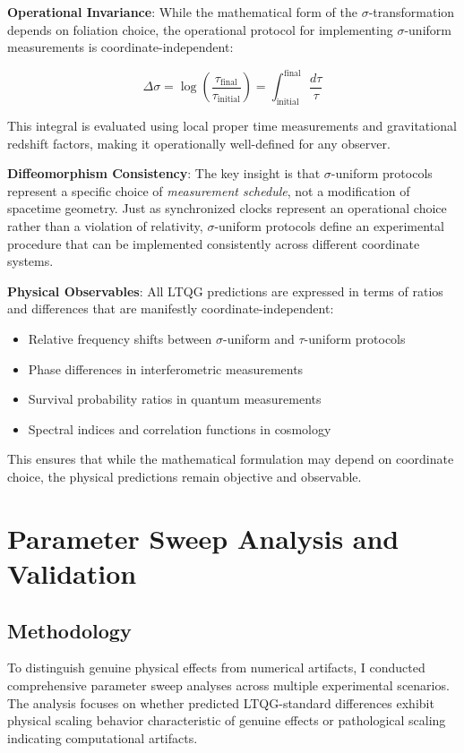 \documentclass[12pt,a4paper]{article}
\begin{document}
\textbf{Operational Invariance}: While the mathematical form of the $\sigma$-transformation depends on foliation choice, the operational protocol for implementing $\sigma$-uniform measurements is coordinate-independent:

\begin{equation}
\Delta \sigma = \log\left(\frac{\tau_{\text{final}}}{\tau_{\text{initial}}}\right) = \int_{\text{initial}}^{\text{final}} \frac{d\tau}{\tau}
\end{equation}

This integral is evaluated using local proper time measurements and gravitational redshift factors, making it operationally well-defined for any observer.

\textbf{Diffeomorphism Consistency}: The key insight is that $\sigma$-uniform protocols represent a specific choice of \emph{measurement schedule}, not a modification of spacetime geometry. Just as synchronized clocks represent an operational choice rather than a violation of relativity, $\sigma$-uniform protocols define an experimental procedure that can be implemented consistently across different coordinate systems.

\textbf{Physical Observables}: All LTQG predictions are expressed in terms of ratios and differences that are manifestly coordinate-independent:
\begin{itemize}
\item Relative frequency shifts between $\sigma$-uniform and $\tau$-uniform protocols
\item Phase differences in interferometric measurements  
\item Survival probability ratios in quantum measurements
\item Spectral indices and correlation functions in cosmology
\end{itemize}

This ensures that while the mathematical formulation may depend on coordinate choice, the physical predictions remain objective and observable.

\section{Parameter Sweep Analysis and Validation}

\subsection{Methodology}

To distinguish genuine physical effects from numerical artifacts, I conducted comprehensive parameter sweep analyses across multiple experimental scenarios. The analysis focuses on whether predicted LTQG-standard differences exhibit physical scaling behavior characteristic of genuine effects or pathological scaling indicating computational artifacts.
\end{document}
